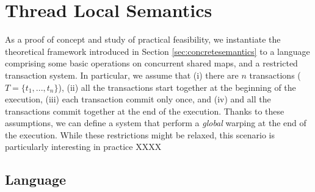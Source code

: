 \newcommand{\set}[1]{\mathsf{#1}}
\newcommand{\isSummary}{\set{isSummary}}
\newcommand{\freshNode}{\set{fresh}}
\newcommand{\heapnode}{\set{HeapNode}}
\newcommand{\reference}{\set{Ref}}
\newcommand{\variable}{\set{Var}}
\newcommand{\env}{\set{Env}}
\newcommand{\map}{\set{Map}}
\newcommand{\aset}[1]{\set{#1}^\#}
\newcommand{\state}{\set{\Sigma}}
\newcommand{\aenv}{\aset{Env}}
\newcommand{\amap}{\aset{Map}}
\newcommand{\astate}{\aset{\Sigma}}
\newcommand{\serializedCFGs}{\set{serializedCFGs}}
\newcommand{\isconcrete}{\set{single}}
\newcommand{\warpdestination}{\set{warpDest}}
\newcommand{\abstracttransactions}{\aset{TId}}

\section{Thread Local Semantics}
\label{se:instance}
As a proof of concept and study of practical feasibility, we instantiate the theoretical framework introduced in Section \ref{sec:concretesemantics} to a language comprising some basic operations on concurrent shared maps, and a restricted transaction system. In particular, we assume that (i) there are $n$ transactions ($T=\{t_1, ..., t_n\}$), (ii) all the transactions start together at the beginning of the execution, (iii) each transaction commit only once, and (iv) and all the transactions commit together at the end of the execution. Thanks to these assumptions, we can define a system that perform a \emph{global} warping at the end of the execution. While these restrictions might be relaxed, this scenario is particularly interesting in practice XXXX


\subsection{Language}
\label{sect:language}

